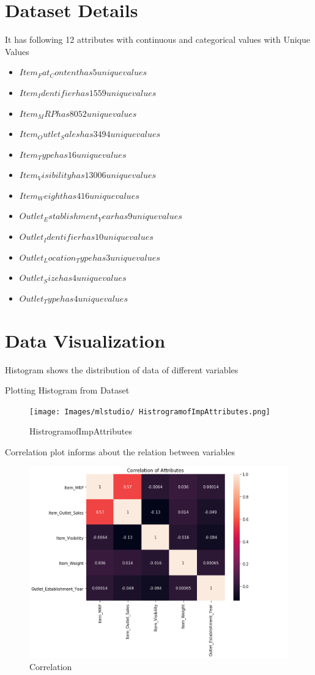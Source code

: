 \section{Dataset Details}
It has following 12 attributes with continuous and categorical values 
with Unique Values
\begin{itemize}
\item $Item_Fat_Content has 5 unique values$
\item $Item_Identifier has 1559 unique values$
\item $Item_MRP has 8052 unique values$
\item $Item_Outlet_Sales has 3494 unique values$
\item $Item_Type has 16 unique values$
\item $Item_Visibility has 13006 unique values$
\item $Item_Weight has 416 unique values$
\item $Outlet_Establishment_Year has 9unique values$
\item $Outlet_Identifier has 10 unique values$
\item $Outlet_Location_Type has 3 unique values$
\item $Outlet_Size has 4 unique values$
\item $Outlet_Type has 4 unique values$
\end{itemize}


\section{Data Visualization}
Histogram shows the distribution of data of different variables 

Plotting Histogram from Dataset

\begin{figure}[pic1]
\centering
\texttt{[image: Images/mlstudio/
HistrogramofImpAttributes.png]}
\caption{HistrogramofImpAttributes}
\label{fig:HistrogramofImpAttributes}
\end{figure}

Correlation plot informs about the relation between variables 
\begin{figure}[pic2]
\centering
\includegraphics[width=\columnwidth]{Images/mlstudio/Correlation.png}
\caption{Correlation}\label{fig:Correlation}
\end{figure}

